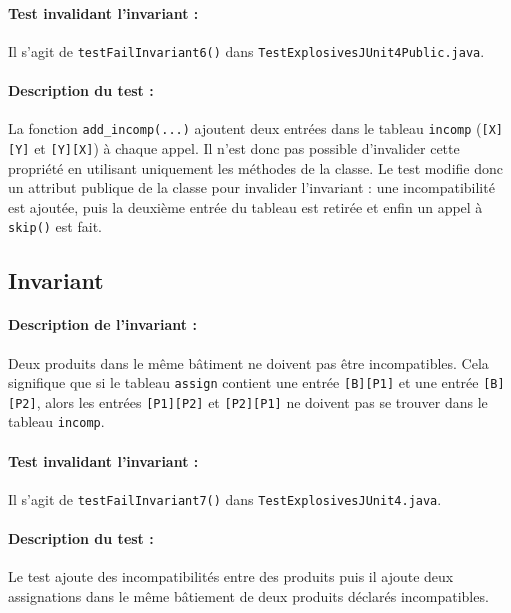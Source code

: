 \documentclass{article}
\begin{document}
\vspace{-0.2cm}
\paragraph{Test invalidant l'invariant :} Il s'agit de \texttt{testFailInvariant6()} dans \texttt{TestExplosivesJUnit4Public.java}.

\vspace{-0.2cm}
\paragraph{Description du test :} La fonction \texttt{add\_incomp(...)} ajoutent deux entrées dans le tableau \texttt{incomp} (\texttt{[X][Y]} et \texttt{[Y][X]}) à chaque appel. Il n'est donc pas possible d'invalider cette propriété en utilisant uniquement les méthodes de la classe. Le test modifie donc un attribut publique de la classe pour invalider l'invariant : une incompatibilité est ajoutée, puis la deuxième entrée du tableau est retirée et enfin un appel à \texttt{skip()} est fait.

\subsection{Invariant }

\paragraph{Description de l'invariant :} Deux produits dans le même bâtiment ne doivent pas être incompatibles. Cela signifique que si le tableau \texttt{assign} contient une entrée \texttt{[B][P1]} et une entrée \texttt{[B][P2]}, alors les entrées \texttt{[P1][P2]} et \texttt{[P2][P1]} ne doivent pas se trouver dans le tableau \texttt{incomp}.

\vspace{-0.2cm}
\paragraph{Test invalidant l'invariant :} Il s'agit de \texttt{testFailInvariant7()} dans \texttt{TestExplosivesJUnit4.java}.

\vspace{-0.2cm}
\paragraph{Description du test :} Le test ajoute des incompatibilités entre des produits puis il ajoute deux assignations dans le même bâtiement de deux produits déclarés incompatibles.
\end{document}
